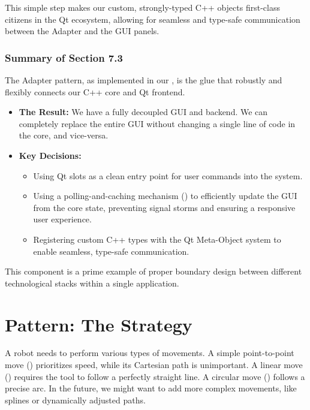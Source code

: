 This simple step makes our custom, strongly-typed C++ objects first-class citizens in the Qt ecosystem, allowing for seamless and type-safe communication between the Adapter and the GUI panels.

\subsubsection{Summary of Section 7.3}
\label{subsubsec:section7_3_summary}
The Adapter pattern, as implemented in our , is the glue that robustly and flexibly connects our C++ core and Qt frontend.
\begin{itemize}
    \item \textbf{The Result:} We have a fully decoupled GUI and backend. We can completely replace the entire GUI without changing a single line of code in the core, and vice-versa.
    \item \textbf{Key Decisions:}
    \begin{itemize}
        \item Using Qt slots as a clean entry point for user commands into the system.
        \item Using a polling-and-caching mechanism () to efficiently update the GUI from the core state, preventing signal storms and ensuring a responsive user experience.
        \item Registering custom C++ types with the Qt Meta-Object system to enable seamless, type-safe communication.
    \end{itemize}
\end{itemize}
This component is a prime example of proper boundary design between different technological stacks within a single application.












\section{Pattern: The Strategy}
\label{sec:pattern_strategy}

A robot needs to perform various types of movements. A simple point-to-point move () prioritizes speed, while its Cartesian path is unimportant. A linear move () requires the tool to follow a perfectly straight line. A circular move () follows a precise arc. In the future, we might want to add more complex movements, like splines or dynamically adjusted paths.

